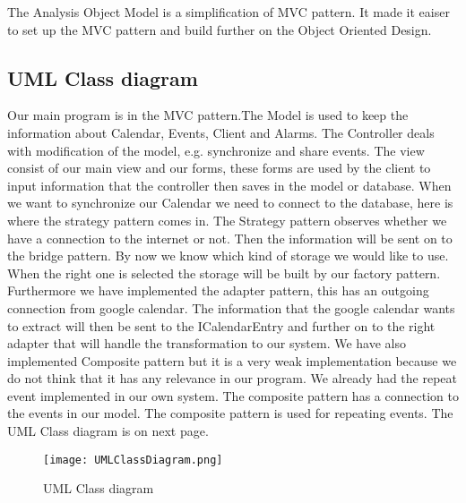 The Analysis Object Model is a simplification of MVC pattern. It made it eaiser to set up the MVC pattern and build further on the Object Oriented Design. 

\subsection{UML Class diagram}
Our main program is in the MVC pattern.The Model is used to keep the information about Calendar, Events, Client and Alarms. The Controller deals with modification of the model, e.g. synchronize and share events. The view consist of our main view and our forms, these forms are used by the client to input information that the controller then saves in the model or database.
When we want to synchronize our Calendar we need to connect to the database, here is where the strategy pattern comes in. The Strategy pattern observes whether we have a connection to the internet or not. Then the information will be sent on to the bridge pattern. By now we know which kind of storage we would like to use. When the right one is selected the storage will be built by our factory pattern. 
Furthermore we have implemented the adapter pattern, this has an outgoing connection from google calendar. The information that the google calendar wants to extract will then be sent to the ICalendarEntry and further on to the right adapter that will handle the transformation to our system. 
We have also implemented Composite pattern but it is a very weak implementation because we do not think that it has any relevance in our program. We already had the repeat event implemented in our own system. The composite pattern has a connection to the events in our model. The composite pattern is used for repeating events.
\newline
The UML Class diagram is on next page.

\begin{sidewaysfigure}
\centering
\texttt{[image: UMLClassDiagram.png]}
\caption{UML Class diagram \label{overflow}}
\label{figur:class}
\end{sidewaysfigure}
